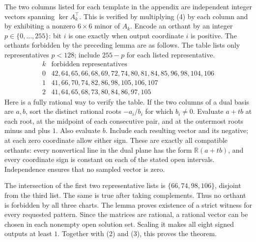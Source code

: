 \documentclass[11pt]{article}
\begin{document}
The two columns listed for each template in the appendix are independent
integer vectors spanning $\ker A_k^\top$. This is verified by
multiplying (4) by each column and by exhibiting a nonzero $6\times6$
minor of $A_k$. Encode an orthant by an integer $p\in\{0,\ldots,255\}$:
bit $i$ is one exactly when output coordinate $i$ is positive. The
orthants forbidden by the preceding lemma are as follows. The table
lists only representatives $p<128$; include $255-p$ for each listed
representative.
\[
\begin{array}{c|l}
 k&\text{forbidden representatives}\\ \hline
0&42,64,65,66,68,69,72,74,80,81,84,85,96,98,104,106\\
1&41,66,70,74,82,86,98,105,106,107\\
2&41,64,65,68,73,80,84,86,97,105
\end{array}
\tag{5}
\]
Here is a fully rational way to verify the table. If the two columns
of a dual basis are $a,b$, sort the distinct rational roots
$-a_i/b_i$ for which $b_i\ne0$. Evaluate $a+tb$ at each root, at
the midpoint of each consecutive pair, and at the outermost roots
minus and plus $1$. Also evaluate $b$. Include each resulting vector
and its negative; at each zero coordinate allow either sign. These are
exactly all compatible orthants: every nonvertical line in the dual
plane has the form $\mathbb R(a+tb)$, and every coordinate sign is
constant on each of the stated open intervals. Independence ensures
that no sampled vector is zero.

The intersection of the first two representative lists is
$\{66,74,98,106\}$, disjoint from the third list. The same is true
after taking complements. Thus no orthant is forbidden by all three
charts. The lemma proves existence of a strict witness for every
requested pattern. Since the matrices are rational, a rational vector
can be chosen in each nonempty open solution set. Scaling it makes
all eight signed outputs at least $1$. Together with (2) and (3), this
proves the theorem.
\end{document}
